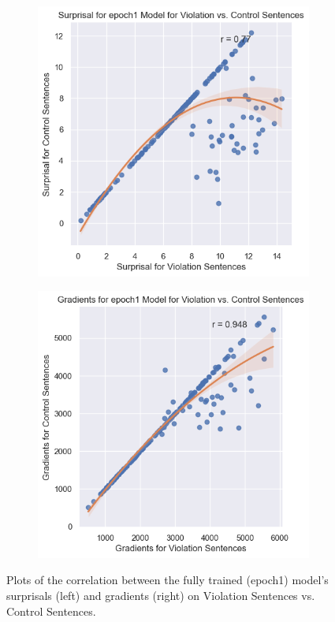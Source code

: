 \documentclass{IEEEtran}
\begin{document}
\begin{figure}
    \centering
    \begin{subfigure}{0.4\textwidth}
        \centering
        \includegraphics[width=\textwidth]{surprisal_violations_vs_control/epoch1.png}
    \end{subfigure}
    \begin{subfigure}{0.4\textwidth}
        \centering
        \includegraphics[width=\textwidth]{gradients_violations_vs_control/epoch1.png}
    \end{subfigure}
    \caption{Plots of the correlation between the fully trained (epoch1) model's surprisals (left) and gradients (right) on Violation Sentences vs. Control Sentences.}
    \label{fig:epoch1_correlations}
\end{figure}
\end{document}
